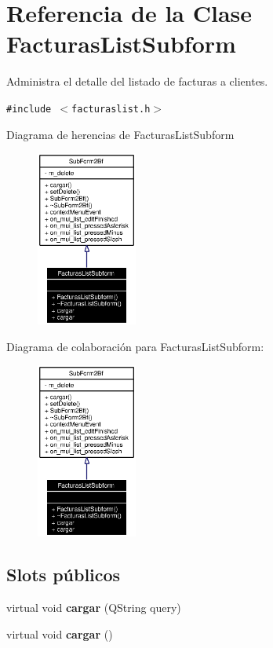 \section{Referencia de la Clase Facturas\-List\-Subform}
\label{classFacturasListSubform}
Administra el detalle del listado de facturas a clientes.  


{\tt \#include $<$facturaslist.h$>$}

Diagrama de herencias de Facturas\-List\-Subform\begin{figure}[H]
\begin{center}
\leavevmode
\includegraphics[width=94pt]{classFacturasListSubform__inherit__graph}
\end{center}
\end{figure}
Diagrama de colaboraci\'{o}n para Facturas\-List\-Subform:\begin{figure}[H]
\begin{center}
\leavevmode
\includegraphics[width=94pt]{classFacturasListSubform__coll__graph}
\end{center}
\end{figure}
\subsection*{Slots p\'{u}blicos}
\begin{CompactItemize}
\item 
virtual void {\bf cargar} (QString query)\label{classFacturasListSubform_i0}

\item 
virtual void {\bf cargar} ()\label{classFacturasListSubform_i1}

\end{CompactItemize}
